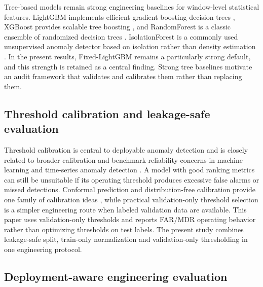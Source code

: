 Tree-based models remain strong engineering baselines for window-level statistical features. LightGBM implements efficient gradient boosting decision trees \cite{Ke2017LightGBM}, XGBoost provides scalable tree boosting \cite{Chen2016XGBoost}, and RandomForest is a classic ensemble of randomized decision trees \cite{Breiman2001RandomForests}. IsolationForest is a commonly used unsupervised anomaly detector based on isolation rather than density estimation \cite{Liu2008IsolationForest,Liu2012IsolationBased}. In the present results, Fixed-\allowbreak LightGBM remains a particularly strong default, and this strength is retained as a central finding. Strong tree baselines motivate an audit framework that validates and calibrates them rather than replacing them.



\subsection{Threshold calibration and leakage-safe evaluation}



Threshold calibration is central to deployable anomaly detection and is closely related to broader calibration and benchmark-reliability concerns in machine learning and time-series anomaly detection \cite{Guo2017Calibration,Wu2021TSADBenchmarksFlawed,Tatbul2018PrecisionRecallTS}. A model with good ranking metrics can still be unsuitable if its operating threshold produces excessive false alarms or missed detections. Conformal prediction and distribution-free calibration provide one family of calibration ideas \cite{Vovk2005Conformal,Lei2018Conformal}, while practical validation-only threshold selection is a simpler engineering route when labeled validation data are available. This paper uses validation-only thresholds and reports FAR/MDR operating behavior rather than optimizing thresholds on test labels. The present study combines leakage-safe split, train-only normalization and validation-only thresholding in one engineering protocol.



\subsection{Deployment-aware engineering evaluation}



